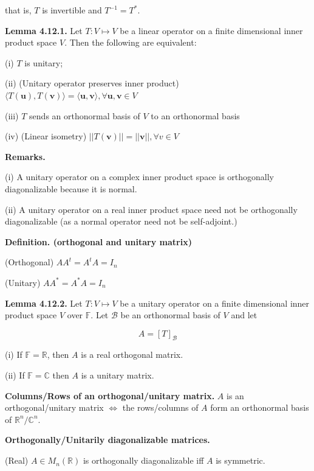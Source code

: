 \documentclass[10pt,landscape]{article}
\begin{document}
\begin{multicols}{4}
that is, $T$ is invertible and $T^{-1} = T^*$.

\textbf{Lemma 4.12.1.} Let $T: V \mapsto V$ be a linear operator on a finite dimensional inner product space $V$. Then the following are equivalent:

(i) $T$ is unitary;

(ii) (Unitary operator preserves inner product) $\langle T(\mathbf{u}), T(\mathbf{v}) \rangle = \langle \mathbf{u, v} \rangle, \forall \mathbf{u, v} \in V$

(iii) $T$ sends an orthonormal basis of $V$ to an orthonormal basis

(iv) (Linear isometry) $|| T(\mathbf{v}) || = || \mathbf{v} ||, \forall v \in V$


\textbf{Remarks.} 

(i) A unitary operator on a complex inner product space is orthogonally diagonalizable because it is normal.

(ii) A unitary operator on a real inner product space need not be orthogonally diagonalizable (as a normal operator need not be self-adjoint.)



\textbf{Definition. (orthogonal and unitary matrix)}

(Orthogonal) $AA^t = A^tA = I_n$ 

(Unitary) $AA^* = A^*A = I_n$

\textbf{Lemma 4.12.2.} Let $T: V \mapsto V$ be a unitary operator on a finite dimensional inner product space $V$ over $\mathbb{F}$. Let $\mathcal{B}$ be an orthonormal basis of $V$ and let 

$$
A = [T]_{\mathcal{B}}
$$

(i) If $\mathbb{F} = \mathbb{R}$, then $A$ is a real orthogonal matrix.

(ii) If $\mathbb{F} = \mathbb{C}$ then $A$ is a unitary matrix.

\textbf{Columns/Rows of an orthogonal/unitary matrix.} $A$ is an orthogonal/unitary matrix $\iff$ the rows/columns of $A$ form an orthonormal basis of $\mathbb{R}^n/\mathbb{C}^n$.

\textbf{Orthogonally/Unitarily diagonalizable matrices.} 

(Real) $A \in M_n(\mathbb{R})$ is orthogonally diagonalizable iff $A$ is symmetric.


\end{multicols}
\end{document}
